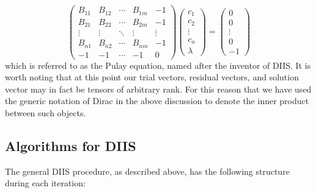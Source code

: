 \documentclass[11pt]{article}
\begin{document}
\begin{equation}
\begin{pmatrix}
B_{11} & B_{12} & \cdots & B_{1m} & -1 \\
B_{21} & B_{22} & \cdots & B_{2m} & -1 \\
\vdots  & \vdots  & \ddots & \vdots  & \vdots \\
B_{n1} & B_{n2} & \cdots & B_{nm} & -1 \\
-1 & -1 & \cdots & -1 & 0
\end{pmatrix}
\begin{pmatrix}
c_1\\
c_2\\
\vdots \\
c_n\\
\lambda
\end{pmatrix}
=
\begin{pmatrix}
0\\
0\\
\vdots\\
0\\
-1
\end{pmatrix}
\end{equation}
which is referred to as the Pulay equation, named after the inventor of DIIS.  It is worth noting that at this point our trial vectors, residual vectors, and solution vector may in fact be tensors of arbitrary rank. For this reason that we have used the generic notation of Dirac in the above discussion to denote the inner product between such objects.

\subsection{Algorithms for DIIS}
The general DIIS procedure, as described above, has the following structure during each iteration:
\end{document}
